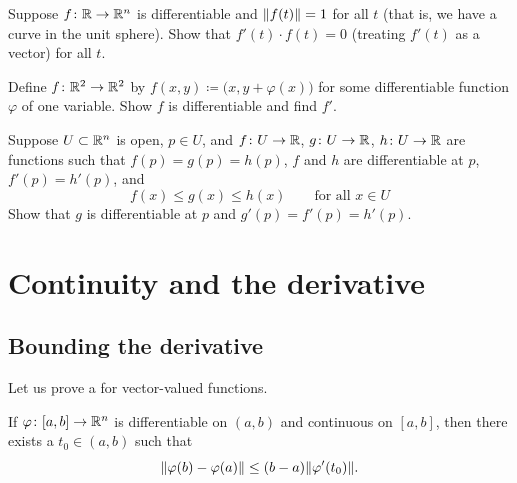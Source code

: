 \begin{exercise}
Suppose $f \colon {\mathbb{R}} \to {\mathbb{R}}^n$ is differentiable and $\lVert {f(t)} \rVert = 1$ for
all $t$ (that is, we have a curve in the unit sphere).  Show that 
$f'(t) \cdot f(t) = 0$ (treating $f'(t)$ as a vector) for all $t$.
\end{exercise}

\begin{exercise}
Define $f \colon {\mathbb{R}}^2 \to {\mathbb{R}}^2$ by $f(x,y) \coloneqq
\bigl(x,y+\varphi(x)\bigr)$ for some differentiable function $\varphi$ of one
variable.  Show $f$ is differentiable and find $f'$.
\end{exercise}

\begin{exercise}
Suppose $U \subset {\mathbb{R}}^n$ is open, $p \in U$, and
$f \colon U \to {\mathbb{R}}$,
$g \colon U \to {\mathbb{R}}$,
$h \colon U \to {\mathbb{R}}$ are functions such that
$f(p) = g(p) = h(p)$, $f$ and $h$ are differentiable at $p$,
$f'(p) = h'(p)$, and
\begin{equation*}
f(x) \leq g(x) \leq h(x) \qquad \text{for all } x \in U
\end{equation*}
Show that $g$ is differentiable at $p$ and 
$g'(p) = f'(p) = h'(p)$.
\end{exercise}


\sectionnewpage
\section{Continuity and the derivative}
\label{sec:svthedercont}


\subsection{Bounding the derivative}

Let us prove a  for vector-valued functions.

\begin{lemma} \label{lemma:mvtmv}
If $\varphi \colon [a,b] \to {\mathbb{R}}^n$ is differentiable on $(a,b)$ and
continuous on $[a,b]$, then there exists a $t_0 \in (a,b)$ such that
\begin{equation*}
\lVert {\varphi(b)-\varphi(a)} \rVert \leq (b-a) \lVert {\varphi'(t_0)} \rVert .
\end{equation*}
\end{lemma}

